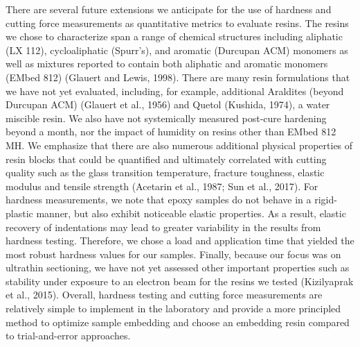 \documentclass{article}
\begin{document}

There are several future extensions we anticipate for the use of hardness and cutting force measurements as quantitative metrics to evaluate resins. The resins we chose to characterize span a range of chemical structures including aliphatic (LX 112), cycloaliphatic (Spurr’s), and aromatic (Durcupan ACM) monomers as well as mixtures reported to contain both aliphatic and aromatic monomers (EMbed 812) (Glauert and Lewis, 1998). There are many resin formulations that we have not yet evaluated, including, for example, additional Araldites (beyond Durcupan ACM) (Glauert et al., 1956) and Quetol (Kushida, 1974), a water miscible resin. We also have not systemically measured post-cure hardening beyond a month, nor the impact of humidity on resins other than EMbed 812 MH. We emphasize that there are also numerous additional physical properties of resin blocks that could be quantified and ultimately correlated with cutting quality such as the glass transition temperature, fracture toughness, elastic modulus and tensile strength (Acetarin et al., 1987; Sun et al., 2017). For hardness measurements, we note that epoxy samples do not behave in a rigid-plastic manner, but also exhibit noticeable elastic properties. As a result, elastic recovery of indentations may lead to greater variability in the results from hardness testing. Therefore, we chose a load and application time that yielded the most robust hardness values for our samples. Finally, because our focus was on ultrathin sectioning, we have not yet assessed other important properties such as stability under exposure to an electron beam for the resins we tested (Kizilyaprak et al., 2015). Overall, hardness testing and cutting force measurements are relatively simple to implement in the laboratory and provide a more principled method to optimize sample embedding and choose an embedding resin compared to trial-and-error approaches.
\end{document}
